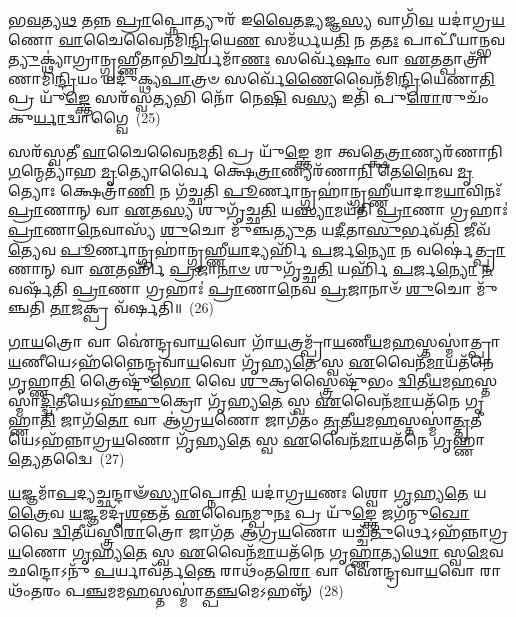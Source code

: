 𑌭\-\ul{𑌵}\-𑌤𑍍𑌯\-\ul{𑌥} 𑌤𑌨𑍍𑌨 \ul{𑌪𑍍𑌰𑌾}\-𑌪𑍍𑌨𑍋𑌤𑍍𑌯𑍁𑌰᳴ 𑌇\-\ul{𑌵𑍈}\-𑌤\-\ul{𑌦𑍍𑌯}\-𑌜𑍍𑌞\-\ul{𑌸𑍍𑌯} 𑌵𑌾𑌗𑌿᳴\-\ul{𑌵} 𑌯𑌦𑌾॑𑌗𑍍𑌰\-\ul{𑌯}\-𑌣𑍋 \ul{𑌵𑌾}\-𑌚𑍈𑌵𑍈𑌨᳴𑌮𑌿\-\ul{𑌨𑍍𑌦𑍍𑌰𑌿}\-𑌯𑍇\-\ul{𑌣} 𑌸𑌮᳴𑌰𑍍𑌧𑌯\-\ul{𑌤𑌿} 𑌨 𑌤\-\ul{𑌤𑌃} 𑌪𑌾𑌪𑍀᳴𑌯𑌾𑌨𑍍𑌭𑌵\-\-\ul{𑌤𑍍𑌯𑍁}\-𑌕𑍍𑌥𑍍𑌯𑌾॑𑌗𑍍𑌰𑌾𑌨𑍍𑌗𑍃𑌹𑍍𑌣𑍀𑌤𑌾𑌭𑌿\-\ul{𑌚}\-𑌰𑍍𑌯𑌮𑌾᳴\-\ul{𑌣𑌃} 𑌸𑌰𑍍𑌵𑍇᳴\-\ul{𑌷𑌾𑌂} 𑌵𑌾 \ul{𑌏}\-𑌤𑌤𑍍𑌪𑌾𑌤𑍍𑌰𑌾᳴𑌣𑌾𑌮𑌿\-\ul{𑌨𑍍𑌦𑍍𑌰𑌿}\-𑌯𑌂 𑌯𑌦𑍁᳴𑌕𑍍𑌥𑍍𑌯\-\ul{𑌪𑌾}\-𑌤𑍍𑌰𑍞 𑌸𑌰𑍍𑌵𑍇᳴\-\ul{𑌣𑍈}\-𑌵𑍈𑌨᳴𑌮𑌿\-\ul{𑌨𑍍𑌦𑍍𑌰𑌿}\-𑌯𑍇𑌣𑌾\-\ul{𑌤𑌿} 𑌪𑍍𑌰 𑌯𑍁᳴\-\ul{𑌙𑍍𑌕𑍍𑌤𑍇} 𑌸𑌰᳴𑌸𑍍𑌵\-\ul{𑌤𑍍𑌯}\-𑌭𑌿 𑌨𑍋᳴ 𑌨𑍇\-\ul{𑌷𑌿} 𑌵\-\ul{𑌸𑍍𑌯} 𑌇𑌤𑌿᳴ 𑌪𑍁\-\ul{𑌰𑍋}\-𑌰𑍁𑌚𑌂᳴ 𑌕𑍁\-\ul{𑌰𑍍𑌯𑌾}\-𑌦𑍍𑌵𑌾𑌗𑍍𑌵𑍈~(25)

𑌸𑌰᳴𑌸𑍍𑌵𑌤𑍀 \ul{𑌵𑌾}\-𑌚𑍈𑌵𑍈\-\ul{𑌨}\-𑌮\-\ul{𑌤𑌿} 𑌪𑍍𑌰 𑌯𑍁᳴\-\ul{𑌙𑍍𑌕𑍍𑌤𑍇} 𑌮𑌾 𑌤𑍍𑌵𑌤𑍍𑌕𑍍𑌷𑍇\-\ul{𑌤𑍍𑌰𑌾}\-𑌣𑍍𑌯𑌰᳴𑌣𑌾𑌨𑌿 \ul{𑌗}\-𑌨𑍍𑌮𑍇𑌤𑍍𑌯𑌾᳴𑌹 \ul{𑌮𑍃}\-𑌤𑍍𑌯𑍋𑌰𑍍𑌵𑍈 𑌕𑍍𑌷𑍇\-\ul{𑌤𑍍𑌰𑌾}\-𑌣𑍍𑌯𑌰᳴𑌣𑌾\-\ul{𑌨𑌿} 𑌤𑍇\-\ul{𑌨𑍈}\-𑌵 \ul{𑌮𑍃}\-𑌤𑍍𑌯𑍋𑌃 𑌕𑍍𑌷𑍇𑌤𑍍𑌰𑌾᳴\-\ul{𑌣𑌿} 𑌨 𑌗᳴𑌚𑍍𑌛𑌤𑌿 \ul{𑌪𑍂}\-𑌰𑍍𑌣𑌾𑌨𑍍𑌗𑍍𑌰𑌹𑌾॑𑌨𑍍𑌗𑍃𑌹𑍍𑌣𑍀𑌯𑌾𑌦𑌾𑌮\-\ul{𑌯𑌾}\-𑌵𑌿𑌨𑌃᳴ \ul{𑌪𑍍𑌰𑌾}\-𑌣𑌾𑌨𑍍 𑌵𑌾 \ul{𑌏}\-𑌤\-\ul{𑌸𑍍𑌯} 𑌶𑍁𑌗𑍃᳴𑌚𑍍𑌛\-\ul{𑌤𑌿} 𑌯\-\ul{𑌸𑍍𑌯𑌾}\-𑌮𑌯᳴𑌤𑌿 \ul{𑌪𑍍𑌰𑌾}\-𑌣𑌾 𑌗𑍍𑌰𑌹𑌾𑌃॑ \ul{𑌪𑍍𑌰𑌾}\-𑌣𑌾\-\ul{𑌨𑍇}\-𑌵𑌾𑌸𑍍𑌯᳴ \ul{𑌶𑍁}\-𑌚𑍋 𑌮𑍁᳴𑌞𑍍𑌚\-\ul{𑌤𑍍𑌯𑍁}\-𑌤 𑌯\-\ul{𑌦𑍀}\-𑌤𑌾\-\ul{𑌸𑍁}\-𑌰𑍍𑌭𑌵᳴\-\ul{𑌤𑌿} 𑌜𑍀𑌵᳴\-\ul{𑌤𑍍𑌯𑍇}\-𑌵 \ul{𑌪𑍂}\-𑌰𑍍𑌣𑌾𑌨𑍍𑌗𑍍𑌰𑌹𑌾॑𑌨𑍍𑌗𑍃𑌹𑍍𑌣𑍀\-\ul{𑌯𑌾}\-𑌦𑍍𑌯𑌰𑍍\mbox{}𑌹𑌿᳴ \ul{𑌪}\-𑌰𑍍𑌜\-\ul{𑌨𑍍𑌯𑍋} 𑌨 𑌵𑌰𑍍\mbox{}𑌷𑍇॑\-\ul{𑌤𑍍𑌪𑍍𑌰𑌾}\-𑌣𑌾𑌨𑍍 𑌵𑌾 \ul{𑌏}\-𑌤𑌰𑍍\mbox{}𑌹𑌿᳴ \ul{𑌪𑍍𑌰}\-𑌜𑌾\-\ul{𑌨𑌾}\-\-\ul{𑍞} 𑌶𑍁𑌗𑍃᳴𑌚𑍍𑌛\-\ul{𑌤𑌿} 𑌯𑌰𑍍\mbox{}𑌹𑌿᳴ \ul{𑌪}\-𑌰𑍍𑌜\-\ul{𑌨𑍍𑌯𑍋} \ul{𑌨} 𑌵𑌰𑍍\mbox{}𑌷᳴𑌤𑌿 \ul{𑌪𑍍𑌰𑌾}\-𑌣𑌾 𑌗𑍍𑌰𑌹𑌾𑌃॑ \ul{𑌪𑍍𑌰𑌾}\-𑌣𑌾\-\ul{𑌨𑍇}\-𑌵 \ul{𑌪𑍍𑌰}\-𑌜𑌾𑌨𑌾𑍞᳴ \ul{𑌶𑍁}\-𑌚𑍋 𑌮𑍁᳴𑌞𑍍𑌚𑌤𑌿 \ul{𑌤𑌾}\-𑌜𑌕𑍍𑌪𑍍𑌰 𑌵᳴𑌰𑍍\mbox{}𑌷𑌤𑌿॥~(26)

{\anuvakamend[{\-\ul{𑌪𑍍𑌰}\-𑌮𑍀𑌯𑍇᳴𑌤 𑌮\-\ul{𑌨𑍁}\-𑌷𑍍𑌯᳴ 𑌋𑌧𑍍𑌯\-\ul{𑌤𑍇} 𑌯𑌸𑍍𑌯᳴ \ul{𑌪𑌿}\-𑌤𑌾 𑌪𑌿᳴𑌤𑌾\-\ul{𑌮}\-𑌹𑌃 𑌪𑍁\-\ul{𑌣𑍍𑌯𑍋} 𑌵𑌾𑌗𑍍𑌵𑌾 \ul{𑌏}\-𑌵 \ul{𑌪𑍂}\-𑌰𑍍𑌣𑌾𑌨𑍍𑌗𑍍𑌰\-\ul{𑌹𑌾}\-𑌨𑍍𑌪𑌞𑍍𑌚᳴𑌵𑌿𑍞𑌶𑌤𑌿𑌶𑍍𑌚}]}%

\-\ul{𑌗𑌾}\-\-\ul{𑌯}\-𑌤𑍍𑌰𑍋 𑌵𑌾 𑌐॑𑌨𑍍𑌦𑍍𑌰𑌵𑌾\-\ul{𑌯}\-𑌵𑍋 𑌗𑌾᳴\-\ul{𑌯}\-𑌤𑍍𑌰𑌮𑍍𑌪𑍍𑌰𑌾᳴\-\ul{𑌯}\-𑌣𑍀\-\ul{𑌯}\-𑌮\-\ul{𑌹}\-𑌸𑍍𑌤𑌸𑍍𑌮𑌾॑𑌤𑍍𑌪𑍍𑌰𑌾\-\ul{𑌯}\-𑌣𑍀𑌯𑍇\-𑌽𑌹᳴𑌨𑍍𑌨𑍈𑌨𑍍𑌦𑍍𑌰𑌵𑌾\-\ul{𑌯}\-𑌵𑍋 𑌗𑍃᳴𑌹𑍍𑌯\-\ul{𑌤𑍇} 𑌸𑍍𑌵 \ul{𑌏}\-𑌵𑍈𑌨᳴\-\ul{𑌮𑌾}\-𑌯𑌤᳴𑌨𑍇 𑌗𑍃𑌹𑍍𑌣𑌾\-\ul{𑌤𑌿} 𑌤𑍍𑌰𑍈𑌷𑍍𑌟𑍁᳴\-\ul{𑌭𑍋} 𑌵𑍈 \ul{𑌶𑍁}\-𑌕𑍍𑌰𑌸𑍍𑌤𑍍𑌰𑍈𑌷𑍍𑌟𑍁᳴𑌭𑌂 \ul{𑌦𑍍𑌵𑌿}\-𑌤𑍀\-\ul{𑌯}\-𑌮\-\ul{𑌹}\-𑌸𑍍𑌤𑌸𑍍𑌮𑌾॑\-\ul{𑌦𑍍𑌦𑍍𑌵𑌿}\-𑌤𑍀𑌯𑍇\-𑌽𑌹᳴\-\ul{𑌞𑍍𑌛𑍁}\-𑌕𑍍𑌰𑍋 𑌗𑍃᳴𑌹𑍍𑌯\-\ul{𑌤𑍇} 𑌸𑍍𑌵 \ul{𑌏}\-𑌵𑍈𑌨᳴\-\ul{𑌮𑌾}\-𑌯𑌤᳴𑌨𑍇 𑌗𑍃𑌹𑍍𑌣𑌾\-\ul{𑌤𑌿} 𑌜𑌾𑌗᳴\-\ul{𑌤𑍋} 𑌵𑌾 𑌆॑𑌗𑍍𑌰\-\ul{𑌯}\-𑌣𑍋 𑌜𑌾𑌗᳴𑌤𑌂 \ul{𑌤𑍃}\-𑌤𑍀\-\ul{𑌯}\-𑌮\-\ul{𑌹}\-𑌸𑍍𑌤𑌸𑍍𑌮𑌾॑\-\ul{𑌤𑍍𑌤𑍃}\-𑌤𑍀𑌯𑍇\-𑌽𑌹᳴𑌨𑍍𑌨𑌾𑌗𑍍𑌰\-\ul{𑌯}\-𑌣𑍋 𑌗𑍃᳴𑌹𑍍𑌯\-\ul{𑌤𑍇} 𑌸𑍍𑌵 \ul{𑌏}\-𑌵𑍈𑌨᳴\-\ul{𑌮𑌾}\-𑌯𑌤᳴𑌨𑍇 𑌗𑍃𑌹𑍍𑌣𑌾\-\ul{𑌤𑍍𑌯𑍇}\-𑌤𑌦𑍍𑌵𑍈~(27)

\-\ul{𑌯}\-𑌜𑍍𑌞𑌮𑌾᳴\-\ul{𑌪}\-𑌦𑍍𑌯𑌚𑍍𑌛𑌨𑍍𑌦𑌾𑍟᳴\-\ul{𑌸𑍍𑌯𑌾}\-𑌪𑍍𑌨𑍋\-\ul{𑌤𑌿} 𑌯𑌦𑌾॑𑌗𑍍𑌰\-\ul{𑌯}\-𑌣𑌃 𑌶𑍍𑌵𑍋 \ul{𑌗𑍃}\-𑌹𑍍𑌯\-\ul{𑌤𑍇} 𑌯\-\ul{𑌤𑍍𑌰𑍈}\-𑌵 \ul{𑌯}\-𑌜𑍍𑌞𑌮𑌦𑍃᳴\-\ul{𑌶}\-𑌨𑍍𑌤𑌤᳴ \ul{𑌏}\-𑌵𑍈\-\ul{𑌨}\-𑌮𑍍𑌪𑍁\-\ul{𑌨𑌃} 𑌪𑍍𑌰 𑌯𑍁᳴\-\ul{𑌙𑍍𑌕𑍍𑌤𑍇} 𑌜𑌗᳴𑌨𑍍𑌮𑍁\-\ul{𑌖𑍋} 𑌵𑍈 \ul{𑌦𑍍𑌵𑌿}\-𑌤𑍀𑌯᳴𑌸𑍍𑌤𑍍𑌰𑌿\-\ul{𑌰𑌾}\-𑌤𑍍𑌰𑍋 𑌜𑌾𑌗᳴𑌤 𑌆𑌗𑍍𑌰\-\ul{𑌯}\-𑌣𑍋 𑌯𑌚𑍍𑌚᳴\-\ul{𑌤𑍁}\-𑌰𑍍𑌥𑍇\-𑌽𑌹᳴𑌨𑍍𑌨𑌾𑌗𑍍𑌰\-\ul{𑌯}\-𑌣𑍋 \ul{𑌗𑍃}\-𑌹𑍍𑌯\-\ul{𑌤𑍇} 𑌸𑍍𑌵 \ul{𑌏}\-𑌵𑍈𑌨᳴\-\ul{𑌮𑌾}\-𑌯𑌤᳴𑌨𑍇 𑌗𑍃\-\ul{𑌹𑍍𑌣𑌾}\-𑌤𑍍𑌯\-\ul{𑌥𑍋} 𑌸𑍍𑌵\-\ul{𑌮𑍇}\-𑌵 𑌛𑌨𑍍𑌦𑍋\-𑌽𑌨𑍁᳴ \ul{𑌪}\-𑌰𑍍𑌯𑌾𑌵᳴𑌰𑍍𑌤\-\ul{𑌨𑍍𑌤𑍇} 𑌰𑌾𑌥𑌂᳴𑌤\-\ul{𑌰𑍋} 𑌵𑌾 𑌐॑𑌨𑍍𑌦𑍍𑌰𑌵𑌾\-\ul{𑌯}\-𑌵𑍋 𑌰𑌾𑌥𑌂᳴𑌤𑌰𑌂 𑌪\-\ul{𑌞𑍍𑌚}\-𑌮𑌮\-\ul{𑌹}\-𑌸𑍍𑌤𑌸𑍍𑌮𑌾॑𑌤𑍍𑌪\-\ul{𑌞𑍍𑌚}\-𑌮𑍇\-𑌽𑌹𑌨𑍍𑌨𑍍᳴~(28)

